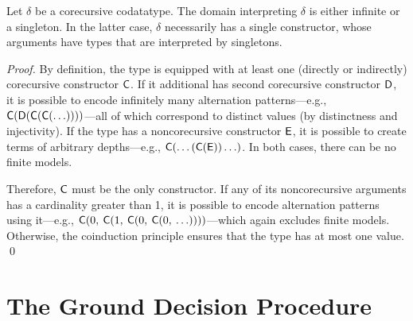 \begin{lemma}%
\label{lem:corecursive-singletons}%
\afterDot
Let $\delta$ be a corecursive codatatype. The domain interpreting $\delta$ is
either infinite or a singleton. In the latter case, $\delta$ necessarily has a
single constructor, whose arguments have types that are interpreted by
singletons.
\end{lemma}

\begin{rep}
\begin{proof}
By definition, the type is equipped with at least one (directly or indirectly)
corecursive constructor $\textsf{C}$. If it additional has second
corecursive constructor $\textsf{D}$, it is possible to encode infinitely many
alternation patterns---e.g.,
$\textsf{C}(\textsf{D}(\textsf{C}(\textsf{C}(\ldots))))$---all of which correspond
to distinct values (by distinctness and injectivity). If the type has a
noncorecursive constructor $\textsf{E}$, it is possible to create terms of
arbitrary depths---e.g., $\textsf{C}(\ldots(\textsf{C}(\textsf{E}))\ldots)$. In
both cases, there can be no finite models.

Therefore, $\textsf{C}$ must be the only constructor.
If any of its noncorecursive arguments has a cardinality greater than 1,
it is possible to encode alternation patterns using it---e.g.,
$\textsf{C}(0,\: \textsf{C}(1,\: \textsf{C}(0,\: \textsf{C}(0,\: \ldots))))$---which
again excludes finite models. Otherwise, the coinduction principle ensures
that the type has at most one value.
\qed
\end{proof}
\end{rep}


\section{The Ground Decision Procedure} %
\label{sec:the-ground-decision-procedure}

